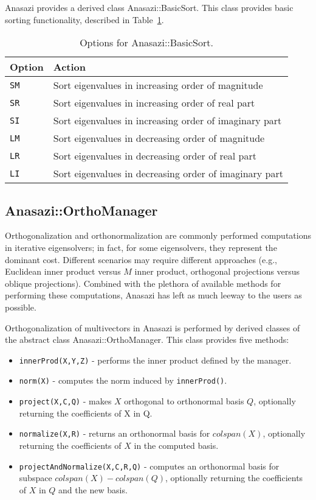 Anasazi provides a derived class Anasazi::BasicSort.  This class provides basic sorting
functionality, described in Table~\ref{tab:anasazi:sm}.

\begin{table}
\begin{center}
\begin{tabular}{| p{2cm} l |}
\hline
Option & Action \\
\hline
{\tt SM} & Sort eigenvalues in increasing order of magnitude \\
{\tt SR} & Sort eigenvalues in increasing order of real part \\
{\tt SI} & Sort eigenvalues in increasing order of imaginary part \\
{\tt LM} & Sort eigenvalues in decreasing order of magnitude \\
{\tt LR} & Sort eigenvalues in decreasing order of real part \\
{\tt LI} & Sort eigenvalues in decreasing order of imaginary part \\
\hline
\end{tabular}
\caption{Options for Anasazi::BasicSort.}
\label{tab:anasazi:sm}
\end{center}
\end{table}


\subsection{Anasazi::OrthoManager}
\label{sec:anasazi:ortho}

Orthogonalization and orthonormalization are commonly performed computations in iterative
eigensolvers; in fact, for some eigensolvers, they represent the dominant cost.  Different
scenarios may require different approaches (e.g., Euclidean inner product versus $M$ inner
product, orthogonal projections versus oblique projections).  Combined with the plethora
of available methods for performing these computations, Anasazi has left as much leeway to
the users as possible.

Orthogonalization of multivectors in Anasazi is performed by derived classes of
the abstract class Anasazi::OrthoManager. This class provides five methods:
\begin{itemize}
  \item \verb!innerProd(X,Y,Z)! - performs the inner product defined by the manager.
  \item \verb!norm(X)! - computes the norm induced by \verb!innerProd()!.
  \item \verb!project(X,C,Q)! - makes $X$ orthogonal to orthonormal basis $Q$, optionally returning the
    coefficients of X in Q.
  \item \verb!normalize(X,R)! - returns an orthonormal basis for $colspan(X)$, optionally
    returning the coefficients of $X$ in the computed basis.
  \item \verb!projectAndNormalize(X,C,R,Q)! - computes an orthonormal basis for subspace
    $colspan(X) - colspan(Q)$, optionally returning the coefficients of
    $X$ in $Q$ and the new basis.
\end{itemize}

